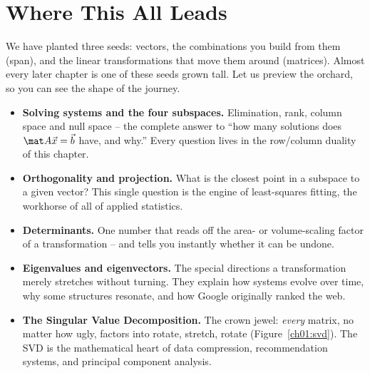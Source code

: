 \section{Where This All Leads}

We have planted three seeds: vectors, the combinations you build from them (span), and the linear
transformations that move them around (matrices). Almost every later chapter is one of these seeds
grown tall. Let us preview the orchard, so you can see the shape of the journey.

\begin{itemize}
  \item \textbf{Solving systems and the four subspaces.} Elimination, rank, column space and null
  space -- the complete answer to ``how many solutions does $\mat A\vec x=\vec b$ have, and why.''
  Every question lives in the row/column duality of this chapter.
  \item \textbf{Orthogonality and projection.} What is the closest point in a subspace to a given
  vector? This single question is the engine of least-squares fitting, the workhorse of all of applied
  statistics.
  \item \textbf{Determinants.} One number that reads off the area- or volume-scaling factor of a
  transformation -- and tells you instantly whether it can be undone.
  \item \textbf{Eigenvalues and eigenvectors.} The special directions a transformation merely
  stretches without turning. They explain how systems evolve over time, why some structures resonate,
  and how Google originally ranked the web.
  \item \textbf{The Singular Value Decomposition.} The crown jewel: \emph{every} matrix, no matter how
  ugly, factors into rotate, stretch, rotate (Figure~\ref{ch01:svd}). The SVD is the mathematical
  heart of data compression, recommendation systems, and principal component analysis.
\end{itemize}

